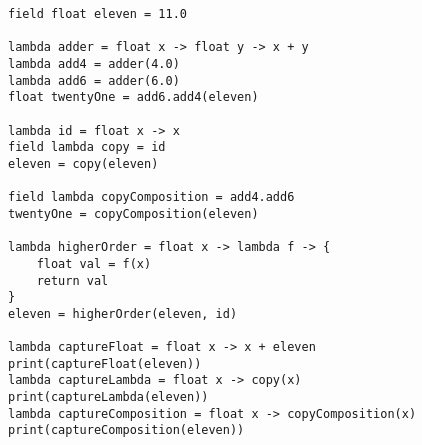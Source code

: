 \begin{lstlisting}[emph={field,float,lambda,return,print},emphstyle={\textbf},caption={The syntax of lambda expressions in \emph{Scandal}.},label={alg:lambdas}]
field float eleven = 11.0

lambda adder = float x -> float y -> x + y
lambda add4 = adder(4.0)
lambda add6 = adder(6.0)
float twentyOne = add6.add4(eleven)

lambda id = float x -> x
field lambda copy = id
eleven = copy(eleven)

field lambda copyComposition = add4.add6
twentyOne = copyComposition(eleven)

lambda higherOrder = float x -> lambda f -> {
	float val = f(x)
	return val
}
eleven = higherOrder(eleven, id)

lambda captureFloat = float x -> x + eleven
print(captureFloat(eleven))
lambda captureLambda = float x -> copy(x)
print(captureLambda(eleven))
lambda captureComposition = float x -> copyComposition(x)
print(captureComposition(eleven))
\end{lstlisting}

